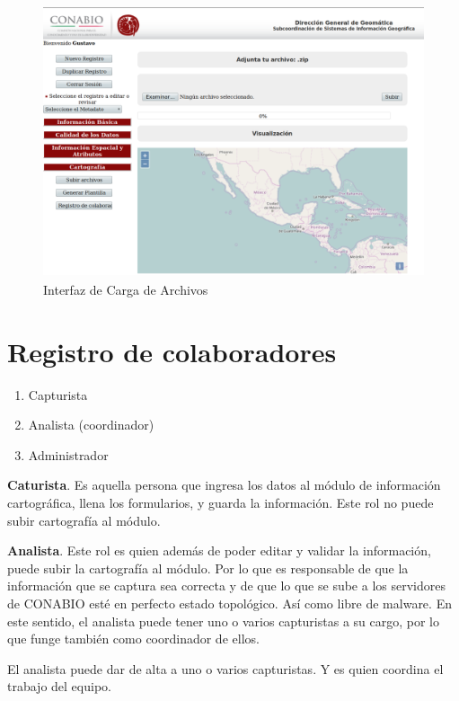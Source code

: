 \documentclass[twoside]{book}
\begin{document}
\begin{figure}[h!] %
	\includegraphics[width=12cm, height=8cm]{img/cartografiaCargaArchivos} %
	\caption{Interfaz de Carga de Archivos}
\end{figure}
\section{Registro de colaboradores}

\begin{enumerate}
\item Capturista
\item Analista (coordinador)
\item Administrador
\end{enumerate}

\textbf{Caturista}. Es aquella persona que ingresa los datos al módulo de información cartográfica, llena los formularios, y guarda la información. Este rol no puede subir cartografía al módulo.

\textbf{Analista}. Este rol es quien además de poder editar y validar la información, puede subir la cartografía al módulo. Por lo que es responsable de que la información que se captura sea correcta y de que lo que se sube a los servidores de CONABIO esté en perfecto estado topológico. Así como libre de malware. En este sentido, el analista puede tener uno o varios capturistas a su cargo, por lo que funge también como coordinador de ellos.

El analista puede dar de alta a uno o varios capturistas. Y es quien coordina el trabajo del equipo.   
\end{document}
